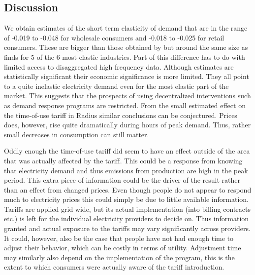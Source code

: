 \begin{comment}
Takes from table 11: 
* Effect mainly driven by DK1. DK2 smaller estimate and insignificant, but can be due to large standard errors smaller sample size of only 9 clusters 
*Overall constant over time => cannot reject elasticities are the same.
Takes from table 12 - Estimation of largest grid companies separately:
*Cerius weird ass.
*differ a lot in magnitude 
*Evonet has very high effect from no of meters 
Takes from table 13: 
* Changes over time elasticity. Highest in 2016, lowest in 2017. I don't know any explanations 
\end{comment}



\subsection{Discussion}
\label{subsec:r_discussion}
We obtain estimates of the short term elasticity of demand that are in the range of -0.019 to -0.048 for wholesale consumers and -0.018 to -0.025 for retail consumers. These are bigger than those obtained by \citet{lijesen2007real} but around the same size as \citet{wolak2001impact} finds for 5 of the 6 most elastic industries. Part of this difference has to do with limited access to disaggregated high frequency data. Although estimates are statistically significant their economic significance is more limited. They all point to a quite inelastic electricity demand even for the most elastic part of the market. This suggests that the prospects of using decentralized interventions such as demand response programs are restricted. From the small estimated effect on the time-of-use tariff in Radius similar conclusions can be conjectured. Prices does, however, rise quite dramatically during hours of peak demand. Thus, rather small decreases in consumption can still matter. %
\bigskip

Oddly enough the time-of-use tariff did seem to have an effect outside of the area that was actually affected by the tariff. This could be a response from knowing that electricity demand and thus emissions from production are high in the peak period. This extra piece of information could be the driver of the result rather than an effect from changed prices. Even though people do not appear to respond much to electricity prices this could simply be due to little available information. Tariffs are applied grid wide, but its actual implementation (into billing contracts etc.) is left for the individual electricity providers to decide on. Thus information granted and actual exposure to the tariffs may vary significantly across providers. It could, however, also be the case that people have not had enough time to adjust their behavior, which can be costly in terms of utility. Adjustment time may similarly also depend on the implementation of the program, this is the extent to which consumers were actually aware of the tariff introduction.
\bigskip

